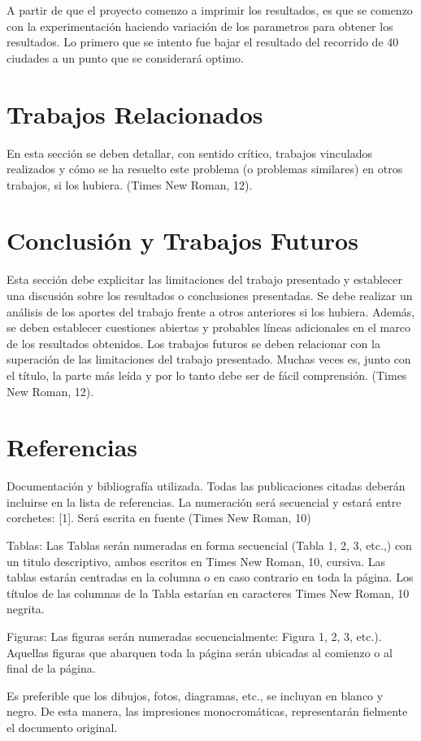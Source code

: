 \begin{multicols}{2}
A partir de que el proyecto comenzo a imprimir los resultados, es que se comenzo con la experimentación haciendo variación de los parametros para obtener los resultados. Lo primero que se intento fue bajar el resultado del recorrido de 40 ciudades a un punto que se considerará optimo. 

\section{Trabajos Relacionados}

En esta sección se deben detallar, con sentido crítico, trabajos vinculados realizados y cómo se ha resuelto este problema (o problemas similares) en otros trabajos, si los hubiera. (Times New Roman, 12).

\section{Conclusión y Trabajos Futuros}

Esta sección debe explicitar las limitaciones del trabajo presentado y establecer una discusión sobre los resultados o conclusiones presentadas. Se debe realizar un análisis de los aportes del trabajo frente a otros anteriores si los hubiera. Además, se deben establecer cuestiones abiertas y probables líneas adicionales en el marco de los resultados obtenidos. Los trabajos futuros se deben relacionar con la superación de las limitaciones del trabajo presentado. Muchas veces es, junto con el título, la parte más leída y por lo tanto debe ser de fácil comprensión. (Times New Roman, 12).

\section{Referencias}

Documentación y bibliografía utilizada. Todas las publicaciones citadas deberán incluirse en la lista de referencias. La numeración será secuencial y estará entre corchetes: [1]. Será escrita en fuente (Times New Roman, 10)



Tablas: Las Tablas serán numeradas en forma secuencial (Tabla 1, 2, 3, etc.,) con un titulo descriptivo, ambos escritos en Times New Roman, 10, cursiva. Las tablas estarán centradas en la columna o en caso contrario en toda la página. Los títulos de las columnas de la Tabla estarían en caracteres Times New Roman, 10 negrita.


Figuras: Las figuras serán numeradas secuencialmente: Figura 1, 2, 3, etc.).
Aquellas figuras que abarquen toda la página serán ubicadas al comienzo o al final de la página.


Es preferible que los dibujos, fotos, diagramas, etc., se incluyan en blanco y negro. De esta manera, las impresiones monocromáticas, representarán fielmente el documento original.

\end{multicols}


